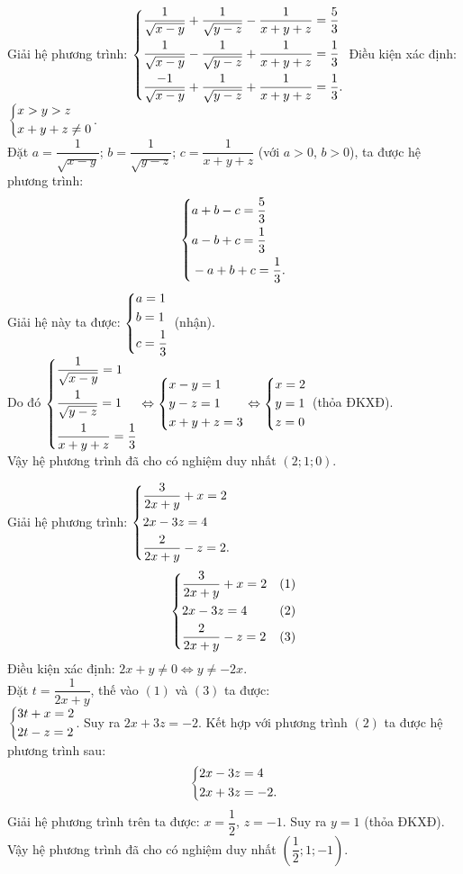 \begin{ex}%
 Giải hệ phương trình: $\left\{\begin{aligned}& \dfrac{1}{\sqrt{x-y}} + \dfrac{1}{\sqrt{y-z}} - \dfrac{1}{x+y+z} = \dfrac{5}{3} \\& \dfrac{1}{\sqrt{x-y}} - \dfrac{1}{\sqrt{y-z}} + \dfrac{1}{x+y+z} = \dfrac{1}{3} \\& \dfrac{-1}{\sqrt{x-y}} + \dfrac{1}{\sqrt{y-z}} + \dfrac{1}{x+y+z} = \dfrac{1}{3} .\end{aligned}\right.$
 \loigiai
  {
  Điều kiện xác định: $\left\{\begin{aligned}& x > y > z \\& x+y+z \neq 0\end{aligned}\right.$.\\
  Đặt $a = \dfrac{1}{\sqrt{x-y}}$; $b = \dfrac{1}{\sqrt{y-z}}$; $c = \dfrac{1}{x+y+z}$ (với $a > 0$, $b > 0$), ta được hệ phương trình:
  $$\left\{\begin{aligned}& a+b-c = \dfrac{5}{3} \\& a-b+c = \dfrac{1}{3} \\& -a+b+c = \dfrac{1}{3}.\end{aligned}\right.$$
  Giải hệ này ta được: $\left\{\begin{aligned}& a = 1 \\& b = 1 \\& c = \dfrac{1}{3}\end{aligned}\right.$ (nhận).\\
  Do đó $\left\{\begin{aligned}& \dfrac{1}{\sqrt{x-y}} = 1 \\& \dfrac{1}{\sqrt{y-z}} = 1 \\& \dfrac{1}{x+y+z} = \dfrac{1}{3}\end{aligned}\right. \Leftrightarrow \left\{\begin{aligned}& x-y = 1 \\& y-z= 1 \\& x+y+z=3\end{aligned}\right. \Leftrightarrow \left\{\begin{aligned}& x = 2 \\& y = 1 \\& z = 0\end{aligned}\right.$ (thỏa ĐKXĐ).\\
  Vậy hệ phương trình đã cho có nghiệm duy nhất $(2;1;0)$.
  }
\end{ex}


\begin{ex}%
 Giải hệ phương trình: $\left\{\begin{aligned}& \dfrac{3}{2x+y}+x=2 \\& 2x-3z=4 \\& \dfrac{2}{2x+y}-z=2.\end{aligned}\right.$
 \loigiai
  {
  $$\left\{\begin{aligned}& \dfrac{3}{2x+y}+x=2 & (1) \\& 2x-3z=4 & (2) \\& \dfrac{2}{2x+y}-z=2 & (3)\end{aligned}\right.$$
  Điều kiện xác định: $2x+y \neq 0 \Leftrightarrow y \neq -2x$.\\
  Đặt $t = \dfrac{1}{2x+y}$, thế vào $(1)$ và $(3)$ ta được:\\
  $\left\{\begin{aligned}& 3t + x = 2 \\& 2t - z = 2\end{aligned}\right.$. Suy ra $2x + 3z = -2$. Kết hợp với phương trình $(2)$ ta được hệ phương trình sau:
  $$\left\{\begin{aligned}& 2x - 3z = 4 \\& 2x + 3z = -2.\end{aligned}\right.$$
  Giải hệ phương trình trên ta được: $x = \dfrac{1}{2}$, $z = -1$. Suy ra $y = 1$ (thỏa ĐKXĐ).\\
  Vậy hệ phương trình đã cho có nghiệm duy nhất $\left(\dfrac{1}{2};1;-1\right)$.
  }
\end{ex}


